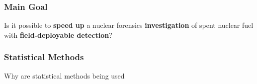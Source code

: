 \begin{frame}
  \frametitle{Main Goal}

  Is it possible to \textbf{speed up} a nuclear forensics
  \textbf{investigation} of spent nuclear fuel with \textbf{field-deployable
  detection}?

\end{frame}

\begin{frame}
  \frametitle{Statistical Methods}

  Why are statistical methods being used

\end{frame}

